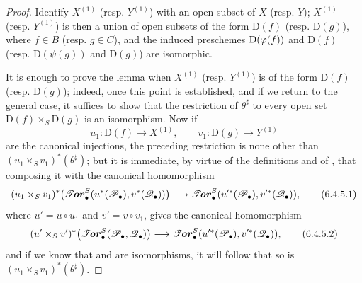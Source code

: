 \begin{proof}
Identify $X^{(1)}$ (resp. $Y^{(1)}$) with an open subset of $X$
(resp. $Y$); $X^{(1)}$ (resp. $Y^{(1)}$) is then a union of
open subsets of the form $\mathrm D(f)$ (resp. $\mathrm D(g)$), where
$f\in B$ (resp. $g\in C$), and the induced preschemes
$\mathrm D(\varphi(f))$ and $\mathrm D(f)$ (resp.
$\mathrm D(\psi(g))$ and $\mathrm D(g)$) are isomorphic.

It is enough to prove the lemma when
$X^{(1)}$ (resp. $Y^{(1)}$) is of the form $\mathrm D(f)$
(resp. $\mathrm D(g)$); indeed, once
this point is established, and if we return to the general case, it suffices to show that the
restriction of $\theta^\sharp$ to every open set
$\mathrm D(f)\times_S\mathrm D(g)$ is an isomorphism.  Now if
\[
  u_1:\mathrm D(f)\longrightarrow X^{(1)},
  \qquad
  v_1:\mathrm D(g)\longrightarrow Y^{(1)}
\]
are the canonical injections, the preceding restriction is none other than
$(u_1\times_Sv_1)^*(\theta^\sharp)$; but it is immediate, by virtue of the definitions
 and of , that
composing it with the canonical homomorphism
\[
  (u_1\times_Sv_1)^*
  \bigl(\boldsymbol{\mathscr{T}\!\mathit{or}}_\bullet^S(u^*(\mathscr{P}_\bullet),v^*(\mathscr{Q}_\bullet))\bigr)
  \longrightarrow
  \boldsymbol{\mathscr{T}\!\mathit{or}}_\bullet^S(u'^*(\mathscr{P}_\bullet),v'^*(\mathscr{Q}_\bullet)),
  \tag{6.4.5.1}\label{III.6.4.5.1}
\]
where $u'=u\circ u_1$ and $v'=v\circ v_1$, gives the canonical
homomorphism
\[
  (u'\times_Sv')^*
  \bigl(\boldsymbol{\mathscr{T}\!\mathit{or}}_\bullet^S(\mathscr{P}_\bullet,\mathscr{Q}_\bullet)\bigr)
  \longrightarrow
  \boldsymbol{\mathscr{T}\!\mathit{or}}_\bullet^S(u'^*(\mathscr{P}_\bullet),v'^*(\mathscr{Q}_\bullet)),
  \tag{6.4.5.2}\label{III.6.4.5.2}
\]
and if we know that  and  are isomorphisms,
it will follow that so is $(u_1\times_Sv_1)^*(\theta^\sharp)$.


\end{proof}
